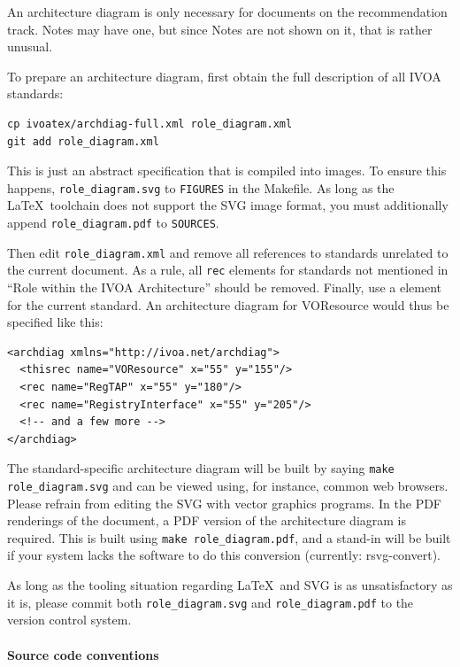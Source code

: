 \documentclass[11pt,a4paper]{ivoa}
\begin{document}
An architecture diagram is only 
necessary for documents on the recommendation track.  Notes may have
one, but since Notes are not shown on it, that is rather
unusual.  

To prepare an architecture diagram, first obtain the full description of
all IVOA standards:

\begin{lstlisting}
cp ivoatex/archdiag-full.xml role_diagram.xml 
git add role_diagram.xml
\end{lstlisting}

This is just an abstract specification that is compiled into images.  To
ensure this happens, \verb|role_diagram.svg| to \verb|FIGURES| in the
Makefile.  As long as the \LaTeX~toolchain does not support the SVG
image format, you must additionally append \verb|role_diagram.pdf| to
\verb|SOURCES|.

Then edit
\texttt{role\_diagram.xml} and remove all references to standards unrelated
to the current document.  As a rule, all \texttt{rec} elements for
standards not mentioned in
``Role within the IVOA Architecture'' should be removed.  Finally, use a
 element for the current standard.  An architecture
diagram for VOResource would thus be specified like this:

\begin{lstlisting}[basicstyle=\footnotesize]
<archdiag xmlns="http://ivoa.net/archdiag">
  <thisrec name="VOResource" x="55" y="155"/>
  <rec name="RegTAP" x="55" y="180"/>
  <rec name="RegistryInterface" x="55" y="205"/>
  <!-- and a few more -->
</archdiag>
\end{lstlisting}

The standard-specific
architecture diagram will be built by saying \texttt{make
role\_diagram.svg} and can be viewed using, for instance, common web
browsers.  Please refrain from editing the SVG with vector graphics
programs.  In the PDF renderings of the document, 
a PDF version of the architecture diagram is
required.  This is built using \texttt{make role\_diagram.pdf}, and a
stand-in will be built if your system lacks the software to do this
conversion (currently: rsvg-convert).

As long as the tooling situation regarding \LaTeX~and SVG is as
unsatisfactory as it is, please commit both \texttt{role\_diagram.svg} and
\texttt{role\_diagram.pdf} to the version control system.

\paragraph{Source code conventions}
\end{document}
